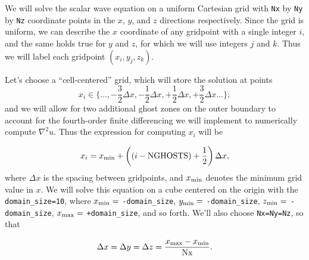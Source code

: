 \documentclass[landscape,letterpaper,10pt,english]{article}
\begin{document}
\[\label{numgrid_freeparams}\]

We will solve the scalar wave equation on a uniform Cartesian grid with
\texttt{Nx} by \texttt{Ny} by \texttt{Nz} coordinate points in the
\(x\), \(y\), and \(z\) directions respectively. Since the grid is
uniform, we can describe the \(x\) coordinate of any gridpoint with a
single integer \(i\), and the same holds true for \(y\) and \(z\), for
which we will use integers \(j\) and \(k\). Thus we will label each
gridpoint \((x_i,y_j,z_k)\).

Let's choose a ``cell-centered'' grid, which will store the solution at
points \[
x_i \in \{..., -\frac{3}{2} \Delta x, -\frac{1}{2} \Delta x, +\frac{1}{2} \Delta x, +\frac{3}{2} \Delta x  ...\};
\] and we will allow for two additional ghost zones on the outer
boundary to account for the fourth-order finite differencing we will
implement to numerically compute \(\nabla^2 u\). Thus the expression for
computing \(x_i\) will be

\[
x_i = x_{\rm min} + \left( (i-\text{NGHOSTS}) + \frac{1}{2} \right) \Delta x,
\] where \(\Delta x\) is the spacing between gridpoints, and
\(x_{\rm min}\) denotes the minimum grid value in \(x\). We will solve
this equation on a cube centered on the origin with the
\texttt{domain\_size=10}, where \(x_{\rm min}=\) \texttt{-domain\_size},
\(y_{\rm min}=\) \texttt{-domain\_size}, \(z_{\rm min}=\)
\texttt{-domain\_size}, \(x_{\rm max}=\) \texttt{+domain\_size}, and so
forth. We'll also choose \texttt{Nx=Ny=Nz}, so that

\[
\Delta x = \Delta y = \Delta z = \frac{x_{\rm max}-x_{\rm min}}{\text{Nx}}.
\]
\end{document}
